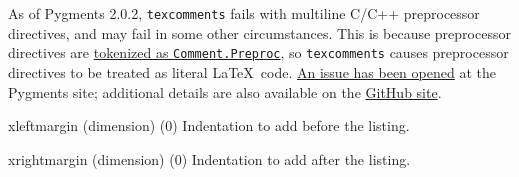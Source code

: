\begin{optionlist}
    As of Pygments 2.0.2, \texttt{texcomments} fails with multiline C/C++ preprocessor directives, and may fail in some other circumstances.  This is because preprocessor directives are \href{http://pygments.org/docs/tokens/}{tokenized as \texttt{Comment.Preproc}}, so \texttt{texcomments} causes preprocessor directives to be treated as literal \LaTeX\ code.  \href{https://bitbucket.org/birkenfeld/pygments-main/issue/1086/wrong-processing-of-in-c-c-macros-if-is}{An issue has been opened} at the Pygments site; additional details are also available on the \href{https://github.com/gpoore/minted/issues/66}{ GitHub site}.
  \item[xleftmargin (dimension) (0)]
    Indentation to add before the listing.
  \item[xrightmargin (dimension) (0)]
    Indentation to add after the listing.

\end{optionlist}



